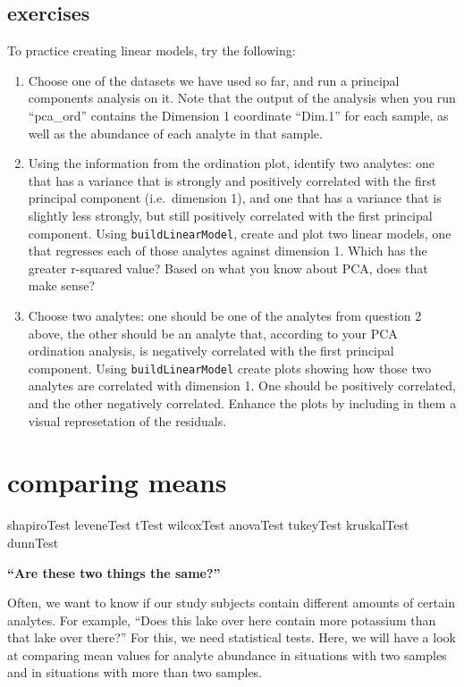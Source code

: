 \documentclass[
]{krantz}
\begin{document}
\hypertarget{exercises-6}{%
\subsection{exercises}\label{exercises-6}}

To practice creating linear models, try the following:

\begin{enumerate}
\def\labelenumi{\arabic{enumi}.}
\item
  Choose one of the datasets we have used so far, and run a principal components analysis on it. Note that the output of the analysis when you run ``pca\_ord'' contains the Dimension 1 coordinate ``Dim.1'' for each sample, as well as the abundance of each analyte in that sample.
\item
  Using the information from the ordination plot, identify two analytes: one that has a variance that is strongly and positively correlated with the first principal component (i.e.~dimension 1), and one that has a variance that is slightly less strongly, but still positively correlated with the first principal component. Using \texttt{buildLinearModel}, create and plot two linear models, one that regresses each of those analytes against dimension 1. Which has the greater r-squared value? Based on what you know about PCA, does that make sense?
\item
  Choose two analytes: one should be one of the analytes from question 2 above, the other should be an analyte that, according to your PCA ordination analysis, is negatively correlated with the first principal component. Using \texttt{buildLinearModel} create plots showing how those two analytes are correlated with dimension 1. One should be positively correlated, and the other negatively correlated. Enhance the plots by including in them a visual represetation of the residuals.
\end{enumerate}

\hypertarget{comparing-means}{%
\section{comparing means}\label{comparing-means}}

shapiroTest
leveneTest
tTest
wilcoxTest
anovaTest
tukeyTest
kruskalTest
dunnTest

\textbf{``Are these two things the same?''}

Often, we want to know if our study subjects contain different amounts of certain analytes. For example, ``Does this lake over here contain more potassium than that lake over there?'' For this, we need statistical tests. Here, we will have a look at comparing mean values for analyte abundance in situations with two samples and in situations with more than two samples.
\end{document}
